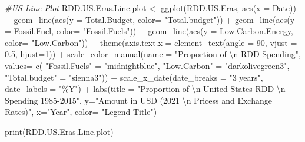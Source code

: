 \documentclass[
  12pt,
]{article}
\newenvironment{Shaded}{\begin{snugshade}}{\end{snugshade}}
\newcommand{\AttributeTok}[1]{\textcolor[rgb]{0.77,0.63,0.00}{#1}}
\newcommand{\CommentTok}[1]{\textcolor[rgb]{0.56,0.35,0.01}{\textit{#1}}}
\newcommand{\DecValTok}[1]{\textcolor[rgb]{0.00,0.00,0.81}{#1}}
\newcommand{\FloatTok}[1]{\textcolor[rgb]{0.00,0.00,0.81}{#1}}
\newcommand{\FunctionTok}[1]{\textcolor[rgb]{0.00,0.00,0.00}{#1}}
\newcommand{\NormalTok}[1]{#1}
\newcommand{\OtherTok}[1]{\textcolor[rgb]{0.56,0.35,0.01}{#1}}
\newcommand{\SpecialCharTok}[1]{\textcolor[rgb]{0.00,0.00,0.00}{#1}}
\newcommand{\StringTok}[1]{\textcolor[rgb]{0.31,0.60,0.02}{#1}}
\begin{document}
\begin{Shaded}
\begin{Highlighting}[]
\CommentTok{\#US Line Plot}
\NormalTok{RDD.US.Eras.Line.plot }\OtherTok{\textless{}{-}} \FunctionTok{ggplot}\NormalTok{(RDD.US.Eras, }\FunctionTok{aes}\NormalTok{(}\AttributeTok{x =}\NormalTok{ Date)) }\SpecialCharTok{+}
  \FunctionTok{geom\_line}\NormalTok{(}\FunctionTok{aes}\NormalTok{(}\AttributeTok{y =}\NormalTok{ Total.Budget, }\AttributeTok{color=} \StringTok{"Total.budget"}\NormalTok{)) }\SpecialCharTok{+}
  \FunctionTok{geom\_line}\NormalTok{(}\FunctionTok{aes}\NormalTok{(}\AttributeTok{y =}\NormalTok{ Fossil.Fuel, }\AttributeTok{color=} \StringTok{"Fossil.Fuels"}\NormalTok{)) }\SpecialCharTok{+}
  \FunctionTok{geom\_line}\NormalTok{(}\FunctionTok{aes}\NormalTok{(}\AttributeTok{y =}\NormalTok{ Low.Carbon.Energy, }\AttributeTok{color=} \StringTok{"Low.Carbon"}\NormalTok{)) }\SpecialCharTok{+}
  \FunctionTok{theme}\NormalTok{(}\AttributeTok{axis.text.x =} \FunctionTok{element\_text}\NormalTok{(}\AttributeTok{angle =} \DecValTok{90}\NormalTok{, }\AttributeTok{vjust =} \FloatTok{0.5}\NormalTok{, }\AttributeTok{hjust=}\DecValTok{1}\NormalTok{)) }\SpecialCharTok{+}
  \FunctionTok{scale\_color\_manual}\NormalTok{(}\AttributeTok{name =} \StringTok{"Proportion of }\SpecialCharTok{\textbackslash{}n}\StringTok{ RDD Spending"}\NormalTok{, }\AttributeTok{values=} \FunctionTok{c}\NormalTok{(}
    \StringTok{"Fossil.Fuels"} \OtherTok{=} \StringTok{"midnightblue"}\NormalTok{, }
    \StringTok{"Low.Carbon"} \OtherTok{=} \StringTok{"darkolivegreen3"}\NormalTok{, }
    \StringTok{"Total.budget"} \OtherTok{=} \StringTok{"sienna3"}\NormalTok{)) }\SpecialCharTok{+}
  \FunctionTok{scale\_x\_date}\NormalTok{(}\AttributeTok{date\_breaks =} \StringTok{"3 years"}\NormalTok{, }\AttributeTok{date\_labels =} \StringTok{"\%Y"}\NormalTok{) }\SpecialCharTok{+}
  \FunctionTok{labs}\NormalTok{(}\AttributeTok{title =} \StringTok{"Proportion of }\SpecialCharTok{\textbackslash{}n}\StringTok{ United States RDD }\SpecialCharTok{\textbackslash{}n}\StringTok{ Spending 1985{-}2015"}\NormalTok{,}
       \AttributeTok{y=}\StringTok{"Amount in USD (2021 }\SpecialCharTok{\textbackslash{}n}\StringTok{ Pricess and Exchange Rates)"}\NormalTok{,}
       \AttributeTok{x=}\StringTok{"Year"}\NormalTok{,}
       \AttributeTok{color=} \StringTok{"Legend Title"}\NormalTok{)}

\FunctionTok{print}\NormalTok{(RDD.US.Eras.Line.plot)}
\end{Highlighting}
\end{Shaded}
\end{document}
